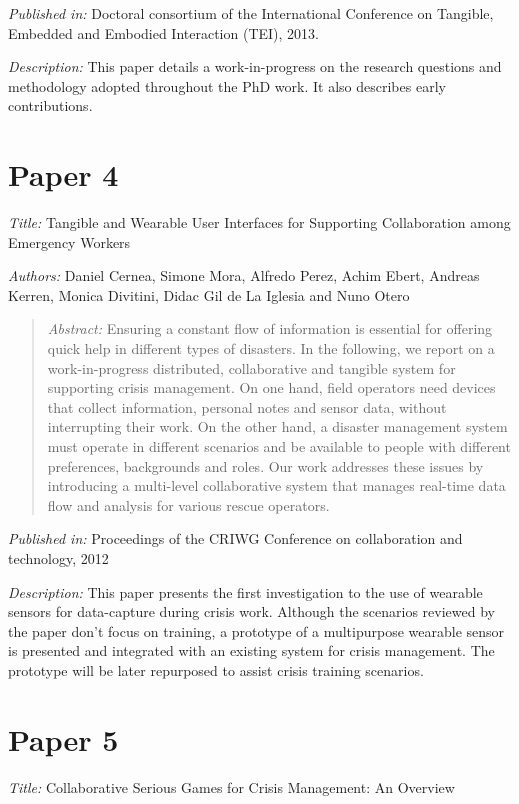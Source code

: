\emph{Published in: }Doctoral consortium of the International Conference on Tangible, Embedded and Embodied Interaction (TEI), 2013.

\emph{Description: }This paper details a work-in-progress on the research questions and methodology adopted throughout the PhD work. It also describes early contributions.

\section*{Paper 4}

\emph{Title: }Tangible and Wearable User Interfaces for Supporting Collaboration among Emergency Workers

\emph{Authors: }Daniel Cernea, Simone Mora, Alfredo Perez, Achim Ebert, Andreas Kerren, Monica Divitini, Didac Gil de La Iglesia and Nuno Otero

\begin{quote}
	\emph{Abstract: }Ensuring a constant flow of information is essential for offering quick help in different types of disasters. In the following, we report on a work-in-progress distributed, collaborative and tangible system for supporting crisis management. On one hand, field operators need devices that collect information, personal notes and sensor data, without interrupting their work. On the other hand, a disaster management system must operate in different scenarios and be available to people with different preferences, backgrounds and roles. Our work addresses these issues by introducing a multi-level collaborative system that manages real-time data flow and analysis for various rescue operators.
\end{quote}

\emph{Published in: }Proceedings of the CRIWG Conference on collaboration and technology, 2012

\emph{Description: }This paper presents the first investigation to the use of wearable sensors for data-capture during crisis work. Although the scenarios reviewed by the paper don't focus on training, a prototype of a multipurpose wearable sensor is presented and integrated with an existing system for crisis management. The prototype will be later repurposed to assist crisis training scenarios.

\section*{Paper 5}

\emph{Title: }Collaborative Serious Games for Crisis Management: An Overview


